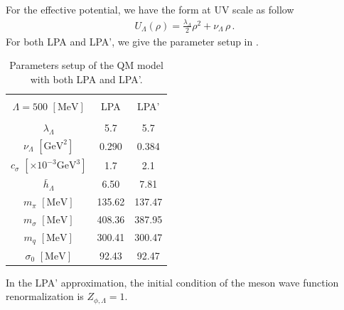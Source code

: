 \documentclass[aps,twocolumn,prd,superscriptaddress,nofootinbib,floatfix]{revtex4-2}
\def\Tab#1{\Cref{#1}}
\begin{document}
For the effective potential, we have the form at UV scale as follow
%
\begin{align}
U_\Lambda(\rho)=\frac{\lambda_\Lambda}{2}\rho^2+\nu_\Lambda\,\rho\,.
\end{align}
%
For both LPA and LPA', we give the parameter setup in \Tab{tab:param-set}.
%
\begin{table}[h]
  \begin{center}
 \begin{tabular}{ccc}
    \hline\hline & & \\[-2ex]   
    \hspace{0.5cm} $\Lambda=500$ $[\mathrm{MeV}]$& LPA & \hspace{0.5cm} LPA' \\[1ex]
    \hline & &  \\[-2ex]
   $\lambda_{\Lambda}$   & 5.7  & 5.7 \\[1ex]
   $\nu_{\Lambda}$ $[\mathrm{GeV}^2]$  & 0.290 & 0.384   \\[1ex]
   \hspace{0.5cm}$c_\sigma$ $[\times10^{-3}\mathrm{GeV}^3]$\hspace{0.5cm}   & 1.7 & 2.1  \\[1ex]
   $\bar h_\Lambda$  & 6.50 & 7.81  \\[1ex]
   \hspace{0.5cm} $m_\pi$ $[\mathrm{MeV}]$ \hspace{0.5cm} & 135.62 & 137.47 \\[1ex]
   \hspace{0.5cm} $m_\sigma$ $[\mathrm{MeV}]$ \hspace{0.5cm} & 408.36 & 387.95 \\[1ex]
   \hspace{0.5cm} $m_q$ $[\mathrm{MeV}]$ \hspace{0.5cm} & 300.41 & 300.47 \\[1ex]
   \hspace{0.5cm} $\sigma_0$ $[\mathrm{MeV}]$ \hspace{0.5cm} & 92.43 & 92.47 \\[1ex]
    \hline\hline
  \end{tabular}
  \caption{Parameters setup of the QM model with both LPA and LPA'.}
  \label{tab:param-set}
  \end{center}\vspace{-0.5cm}
\end{table}
%
In the LPA' approximation, the initial condition of the meson wave function renormalization is $Z_{\phi,\Lambda}=1$.
\end{document}
